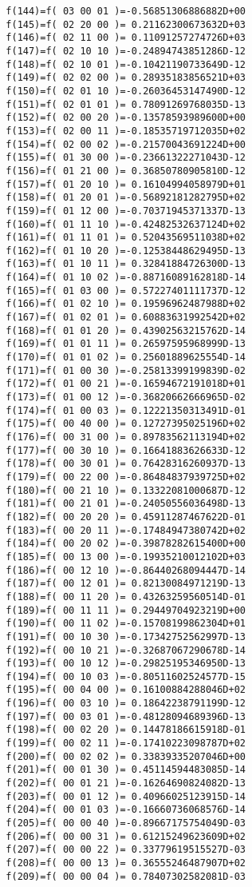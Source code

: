 {\begin{verbatim}
  f(144)=f( 03 00 01 )=-0.56851306886882D+00
  f(145)=f( 02 20 00 )= 0.21162300673632D+03
  f(146)=f( 02 11 00 )= 0.11091257274726D+03
  f(147)=f( 02 10 10 )=-0.24894743851286D-12
  f(148)=f( 02 10 01 )=-0.10421190733649D-12
  f(149)=f( 02 02 00 )= 0.28935183856521D+03
  f(150)=f( 02 01 10 )=-0.26036453147490D-12
  f(151)=f( 02 01 01 )= 0.78091269768035D-13
  f(152)=f( 02 00 20 )=-0.13578593989600D+00
  f(153)=f( 02 00 11 )=-0.18535719712035D+02
  f(154)=f( 02 00 02 )=-0.21570043691224D+00
  f(155)=f( 01 30 00 )=-0.23661322271043D-12
  f(156)=f( 01 21 00 )= 0.36850780905810D-12
  f(157)=f( 01 20 10 )= 0.16104994058979D+01
  f(158)=f( 01 20 01 )=-0.56892181282795D+02
  f(159)=f( 01 12 00 )=-0.70371945371337D-13
  f(160)=f( 01 11 10 )=-0.42482532637124D+02
  f(161)=f( 01 11 01 )= 0.52043569511038D+02
  f(162)=f( 01 10 20 )=-0.12538448629495D-13
  f(163)=f( 01 10 11 )= 0.32841884726300D-13
  f(164)=f( 01 10 02 )=-0.88716089162818D-14
  f(165)=f( 01 03 00 )= 0.57227401111737D-12
  f(166)=f( 01 02 10 )= 0.19596962487988D+02
  f(167)=f( 01 02 01 )= 0.60883631992542D+02
  f(168)=f( 01 01 20 )= 0.43902563215762D-14
  f(169)=f( 01 01 11 )= 0.26597595968999D-13
  f(170)=f( 01 01 02 )= 0.25601889625554D-14
  f(171)=f( 01 00 30 )=-0.25813399199839D-02
  f(172)=f( 01 00 21 )=-0.16594672191018D+01
  f(173)=f( 01 00 12 )=-0.36820662666965D-02
  f(174)=f( 01 00 03 )= 0.12221350313491D-01
  f(175)=f( 00 40 00 )= 0.12727395025196D+02
  f(176)=f( 00 31 00 )= 0.89783562113194D+02
  f(177)=f( 00 30 10 )= 0.16641883626633D-12
  f(178)=f( 00 30 01 )= 0.76428316260937D-13
  f(179)=f( 00 22 00 )=-0.86484837939725D+02
  f(180)=f( 00 21 10 )= 0.13322081000687D-12
  f(181)=f( 00 21 01 )=-0.24050556036498D-13
  f(182)=f( 00 20 20 )= 0.45911287467622D-01
  f(183)=f( 00 20 11 )=-0.17484947380742D+02
  f(184)=f( 00 20 02 )=-0.39878282615400D+00
  f(185)=f( 00 13 00 )=-0.19935210012102D+03
  f(186)=f( 00 12 10 )=-0.86440268094447D-14
  f(187)=f( 00 12 01 )= 0.82130084971219D-13
  f(188)=f( 00 11 20 )= 0.43263259560514D-01
  f(189)=f( 00 11 11 )= 0.29449704923219D+00
  f(190)=f( 00 11 02 )=-0.15708199862304D+01
  f(191)=f( 00 10 30 )=-0.17342752562997D-13
  f(192)=f( 00 10 21 )=-0.32687067290678D-14
  f(193)=f( 00 10 12 )=-0.29825195346950D-13
  f(194)=f( 00 10 03 )=-0.80511602524577D-15
  f(195)=f( 00 04 00 )= 0.16100884288046D+02
  f(196)=f( 00 03 10 )= 0.18642238791199D-12
  f(197)=f( 00 03 01 )=-0.48128094689396D-13
  f(198)=f( 00 02 20 )= 0.14478186615918D-01
  f(199)=f( 00 02 11 )=-0.17410223098787D+02
  f(200)=f( 00 02 02 )= 0.33839335207046D+00
  f(201)=f( 00 01 30 )= 0.45114594483085D-14
  f(202)=f( 00 01 21 )=-0.16264690824082D-13
  f(203)=f( 00 01 12 )= 0.40966025123915D-14
  f(204)=f( 00 01 03 )=-0.16660736068576D-14
  f(205)=f( 00 00 40 )=-0.89667175754049D-03
  f(206)=f( 00 00 31 )= 0.61215249623609D+02
  f(207)=f( 00 00 22 )= 0.33779619515527D-03
  f(208)=f( 00 00 13 )= 0.36555246487907D+02
  f(209)=f( 00 00 04 )= 0.78407302582081D-03
\end{verbatim}}

